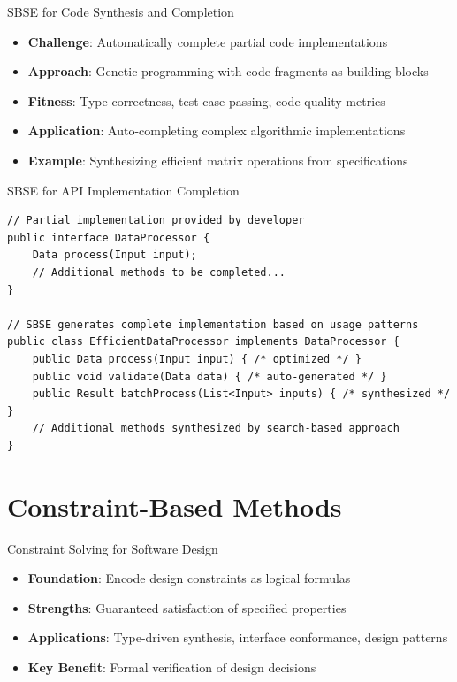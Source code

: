 \documentclass{beamer}
\begin{document}
\begin{frame}[t]{SBSE for Code Synthesis and Completion}
\begin{itemize}
\item \textbf{Challenge}: Automatically complete partial code implementations
\item \textbf{Approach}: Genetic programming with code fragments as building blocks
\item \textbf{Fitness}: Type correctness, test case passing, code quality metrics
\item \textbf{Application}: Auto-completing complex algorithmic implementations
\item \textbf{Example}: Synthesizing efficient matrix operations from specifications
\end{itemize}
\end{frame}

\begin{frame}[fragile,t]{SBSE for API Implementation Completion}
\begin{verbatim}
// Partial implementation provided by developer
public interface DataProcessor {
    Data process(Input input);
    // Additional methods to be completed...
}

// SBSE generates complete implementation based on usage patterns
public class EfficientDataProcessor implements DataProcessor {
    public Data process(Input input) { /* optimized */ }
    public void validate(Data data) { /* auto-generated */ }
    public Result batchProcess(List<Input> inputs) { /* synthesized */ }
    // Additional methods synthesized by search-based approach
}
\end{verbatim}
\end{frame}

\section{Constraint-Based Methods}
\begin{frame}[t]{Constraint Solving for Software Design}
\begin{itemize}
\item \textbf{Foundation}: Encode design constraints as logical formulas
\item \textbf{Strengths}: Guaranteed satisfaction of specified properties
\item \textbf{Applications}: Type-driven synthesis, interface conformance, design patterns
\item \textbf{Key Benefit}: Formal verification of design decisions
\end{itemize}
\end{frame}
\end{document}
